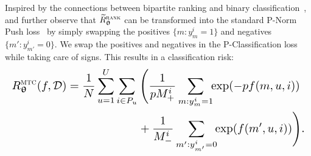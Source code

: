 

Inspired by the connections between bipartite ranking and binary classification~\cite{ertekin2011equivalence,menon2016bipartite},
and further observe that $\widetilde R_{{\bm{\uptheta}}}^{\textsc{rank}}$ can be transformed into the standard P-Norm Push loss~\cite{rudin2009p} 
by simply swapping the positives {\small $\{m: y_m^i = 1\}$} and negatives {\small $\{m': y_{m'}^i = 0\}$}. %
We swap the positives and negatives in the P-Classification loss~\cite{ertekin2011equivalence} while taking care of signs.
This results in a classification risk:
\begin{equation}
\label{eq:clfrisk}
\resizebox{\columnwidth}{!}{$\displaystyle
\begin{aligned}
R_{\upthetabm}^{\textsc{mtc}}(f, \DCal)
= \frac{1}{N} \sum_{u=1}^U 
& \sum_{i \in P_u} \Bigg(
  \frac{1}{p M_+^i} \sum_{m: y_m^i = 1} \!\! \exp(-p f(m, u, i)) \\
& \hspace{2em}  + \frac{1}{M_-^i} \sum_{m': y_{m'}^i = 0} \!\! \exp(f(m', u, i)) \Bigg).
\end{aligned}
$}
\end{equation}



